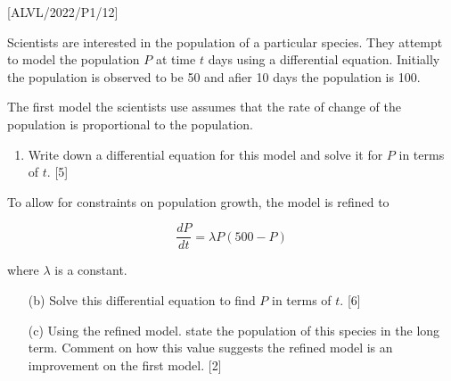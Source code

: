 \item {[}ALVL/2022/P1/12{]}

Scientists are interested in the population of a particular species.
They attempt to model the population $P$ at time $t$ days using
a differential equation. Initially the population is observed to be
50 and afier 10 days the population is 100.

The first model the scientists use assumes that the rate of change
of the population is proportional to the population.
\begin{enumerate}
\item Write down a differential equation for this model and solve it for
$P$ in terms of $t$.\hfill{} {[}5{]} 
\end{enumerate}
To allow for constraints on population growth, the model is refined
to 

\[
\frac{dP}{dt}=\lambda P\left(500-P\right)
\]

where $\lambda$ is a constant. 
\begin{enumerate}
\item[(b)]  Solve this differential equation to find $P$ in terms of $t$.\hfill{}
{[}6{]}
\item[(c)]  Using the refined model. state the population of this species in
the long term. Comment on how this value suggests the refined model
is an improvement on the first model.\hfill{} {[}2{]}
\end{enumerate}
